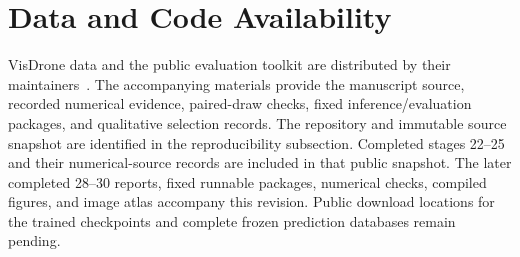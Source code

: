 \documentclass[journal]{IEEEtran}
\begin{document}
\section*{Data and Code Availability}
VisDrone data and the public evaluation toolkit are distributed by their maintainers~\cite{du2019visdrone,visdrone_toolkit}. The accompanying materials provide the manuscript source, recorded numerical evidence, paired-draw checks, fixed inference/evaluation packages, and qualitative selection records. The repository and immutable source snapshot are identified in the reproducibility subsection. Completed stages 22--25 and their numerical-source records are included in that public snapshot. The later completed 28--30 reports, fixed runnable packages, numerical checks, compiled figures, and image atlas accompany this revision. Public download locations for the trained checkpoints and complete frozen prediction databases remain pending.




\end{document}
